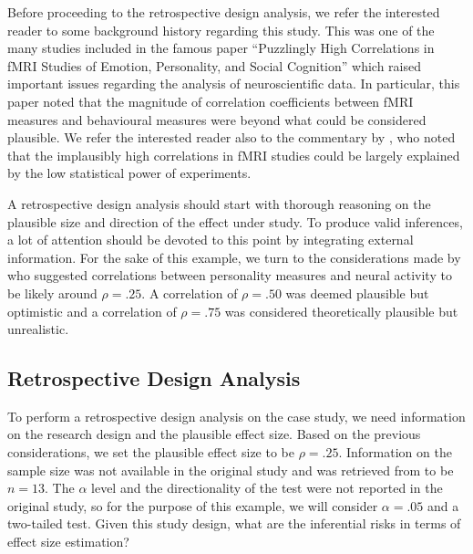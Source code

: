 \documentclass{article}\usepackage[]{graphicx}\usepackage[]{color}
\begin{document}
Before proceeding to the retrospective design analysis, we refer the interested reader to some background history regarding this study. This was one of the many studies included in the famous paper “Puzzlingly High Correlations in fMRI Studies of Emotion, Personality, and Social Cognition” \parencite{vulPuzzlinglyHighCorrelations2009} which raised important issues regarding the analysis of neuroscientific data. In particular, this paper noted that the magnitude of correlation coefficients between fMRI measures and behavioural measures were beyond what could be considered plausible. We refer the interested reader also to the commentary by \textcite{yarkoniBigCorrelationsLittle2009}, who noted that the implausibly high correlations in fMRI studies could be largely explained by the low statistical power of experiments.

A retrospective design analysis should start with thorough reasoning on the plausible size and direction of the effect under study. To produce valid inferences, a lot of attention should be devoted to this point by integrating external information. For the sake of this example, we turn to the considerations made by \textcite{vulSuspiciouslyHighCorrelations2017} who suggested correlations between personality measures and neural activity to be likely around $\rho=.25$.  A correlation of $\rho=.50$ was deemed plausible but optimistic and a correlation of $\rho=.75$ was considered theoretically plausible but unrealistic.



\subsection{Retrospective Design Analysis}

To perform a retrospective design analysis on the case study, we need information on the research design and the plausible effect size. Based on the previous considerations, we set the plausible effect size to be $\rho=.25$. Information on the sample size was not available in the original study \parencite{eisenbergerDoesRejectionHurt2003} and was retrieved from \textcite{vulPuzzlinglyHighCorrelations2009} to be $n=13$. The $\alpha$ level and the directionality of the test were not reported in the original study, so for the purpose of this example, we will consider $\alpha=.05$  and a two-tailed test. Given this study design, what are the inferential risks in terms of effect size estimation?
\end{document}

